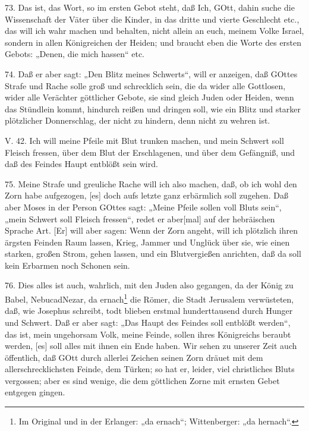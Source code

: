 73. Das ist, das Wort, so im ersten Gebot steht, daß Ich, GOtt, dahin suche die Wissenschaft der Väter über die Kinder, in das dritte und vierte Geschlecht etc., das will ich wahr machen und behalten, nicht allein an euch, meinem Volke Israel, sondern in allen Königreichen der Heiden; und braucht eben die Worte des ersten Gebots: „Denen, die mich hassen“ etc.

74. Daß er aber sagt: „Den Blitz meines Schwerts“, will er anzeigen, daß GOttes Strafe und Rache solle groß und schrecklich sein, die da wider alle Gottlosen, wider alle Verächter göttlicher Gebote, sie sind gleich Juden oder Heiden, wenn das Stündlein kommt, hindurch reißen und dringen soll, wie ein Blitz und starker plötzlicher Donnerschlag, der nicht zu hindern, denn nicht zu wehren ist.

\begin{schriftzitat}
V. 42. Ich will meine Pfeile mit Blut trunken machen, und mein Schwert soll Fleisch fressen, über dem Blut der Erschlagenen, und über dem Gefängniß, und daß des Feindes Haupt entblößt sein wird.
\end{schriftzitat}

75. Meine Strafe und greuliche Rache will ich also machen, daß, ob ich wohl den Zorn habe aufgezogen, [es] doch aufs letzte ganz erbärmlich soll zugehen. Daß aber Moses in der Person GOttes sagt: „Meine Pfeile sollen voll Bluts sein“, „mein Schwert soll Fleisch fressen“, redet er aber[mal] auf der hebräischen Sprache Art. [Er] will aber sagen: Wenn der Zorn angeht, will ich plötzlich ihren ärgsten Feinden Raum lassen, Krieg, Jammer und Unglück über sie, wie einen starken, großen Strom, gehen lassen, und ein Blutvergießen anrichten, daß da soll kein Erbarmen noch Schonen sein.

76. Dies alles ist auch, wahrlich, mit den Juden also gegangen, da der König zu Babel, NebucadNezar, da ernach\footnote{Im Original und in der Erlanger: „da ernach“; Wittenberger: „da hernach“.} die Römer, die Stadt Jerusalem verwüsteten, daß, wie Josephus schreibt, todt blieben erstmal hunderttausend durch Hunger und Schwert. Daß er aber sagt: „Das Haupt des Feindes soll entblößt werden“, das ist, mein ungehorsam Volk, meine Feinde, sollen ihres Königreichs beraubt werden, [es] soll alles mit ihnen ein Ende haben. Wir sehen zu unserer Zeit auch öffentlich, daß GOtt durch allerlei Zeichen seinen Zorn dräuet mit dem allerschrecklichsten Feinde, dem Türken; so hat er, leider, viel christliches Bluts vergossen; aber es sind wenige, die dem göttlichen Zorne mit ernsten Gebet entgegen gingen.
